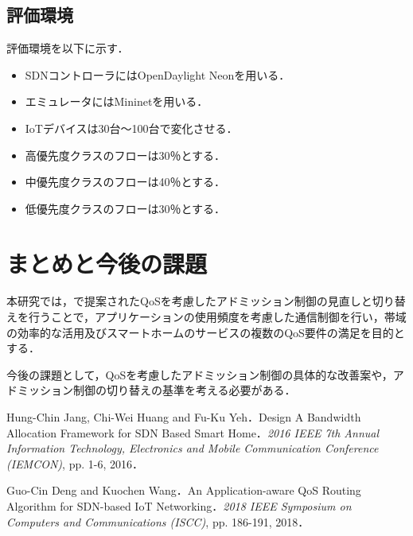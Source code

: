 \documentclass[a4paper,10pt,twocolumn,uplatex]{jsarticle}
\begin{document}
\subsection{評価環境}
評価環境を以下に示す．\par

\begin{itemize}
  \item SDNコントローラにはOpenDaylight Neonを用いる．
  \item エミュレータにはMininetを用いる．
  \item IoTデバイスは30台〜100台で変化させる．
  \item 高優先度クラスのフローは30％とする．
  \item 中優先度クラスのフローは40％とする．
  \item 低優先度クラスのフローは30％とする．
\end{itemize}

\section{まとめと今後の課題}
本研究では，\cite{AQRA}で提案されたQoSを考慮したアドミッション制御の見直しと切り替えを行うことで，アプリケーションの使用頻度を考慮した通信制御を行い，帯域の効率的な活用及びスマートホームのサービスの複数のQoS要件の満足を目的とする．\par
今後の課題として，QoSを考慮したアドミッション制御の具体的な改善案や，アドミッション制御の切り替えの基準を考える必要がある．\par

\footnotesize{
  \begin{thebibliography}{99}
     Hung-Chin Jang, Chi-Wei Huang and Fu-Ku Yeh．Design A Bandwidth Allocation Framework for SDN Based Smart Home．\textit{2016 IEEE 7th Annual Information Technology, Electronics and Mobile Communication Conference (IEMCON)}, pp. 1-6, 2016．

     Guo-Cin Deng and Kuochen Wang．An Application-aware QoS Routing Algorithm for SDN-based IoT Networking．\textit{2018 IEEE Symposium on Computers and Communications (ISCC)}, pp. 186-191, 2018．
  \end{thebibliography}
}

\end{document}
